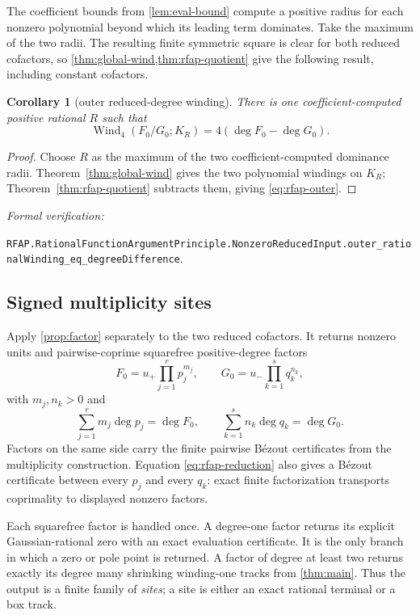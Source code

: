 \documentclass[11pt]{article}
\newtheorem{corollary}[theorem]{Corollary}
\newcommand{\Wind}{\operatorname{Wind}}
\newcommand{\leanref}[1]{\par\smallskip\noindent
  \emph{Formal verification:}\par\nobreak
  {\raggedright\nolinkurl{#1}.\par}}
\begin{document}
The coefficient bounds from \cref{lem:eval-bound} compute a positive radius
for each nonzero polynomial beyond which its leading term dominates.  Take
the maximum of the two radii.  The resulting finite symmetric square is
clear for both reduced cofactors, so \cref{thm:global-wind,thm:rfap-quotient}
give the following result, including constant cofactors.

\begin{corollary}[outer reduced-degree winding]
\label{cor:rfap-outer}
There is one coefficient-computed positive rational $R$ such that
\begin{equation}
\label{eq:rfap-outer}
 \Wind_4(F_0/G_0;K_R)=4(\deg F_0-\deg G_0).
\end{equation}
\end{corollary}

\begin{proof}
Choose $R$ as the maximum of the two coefficient-computed dominance radii.
Theorem~\ref{thm:global-wind} gives the two polynomial windings on $K_R$;
Theorem~\ref{thm:rfap-quotient} subtracts them, giving
\eqref{eq:rfap-outer}.
\end{proof}

\leanref{RFAP.RationalFunctionArgumentPrinciple.NonzeroReducedInput.outer_rationalWinding_eq_degreeDifference}

\subsection{Signed multiplicity sites}

Apply \cref{prop:factor} separately to the two reduced cofactors.  It returns
nonzero units and pairwise-coprime squarefree positive-degree factors
\begin{equation}
\label{eq:rfap-weighted-factorization}
 F_0=u_+\prod_{j=1}^{r}p_j^{m_j},\qquad
 G_0=u_-\prod_{k=1}^{s}q_k^{n_k},
\end{equation}
with $m_j,n_k>0$ and
\begin{equation}
\label{eq:rfap-weighted-degrees}
 \sum_{j=1}^{r}m_j\deg p_j=\deg F_0,
 \qquad
 \sum_{k=1}^{s}n_k\deg q_k=\deg G_0.
\end{equation}
Factors on the same side carry the finite pairwise Bézout certificates from
the multiplicity construction.  Equation \eqref{eq:rfap-reduction} also
gives a Bézout certificate between every $p_j$ and every $q_k$: exact finite
factorization transports coprimality to displayed nonzero factors.

Each squarefree factor is handled once.  A degree-one factor returns its
explicit Gaussian-rational zero with an exact evaluation certificate.  It is
the only branch in which a zero or pole point is returned.  A factor of
degree at least two returns exactly its degree many shrinking winding-one
tracks from \cref{thm:main}.  Thus the output is a finite family of
\emph{sites}; a site is either an exact rational terminal or a box track.
\end{document}
